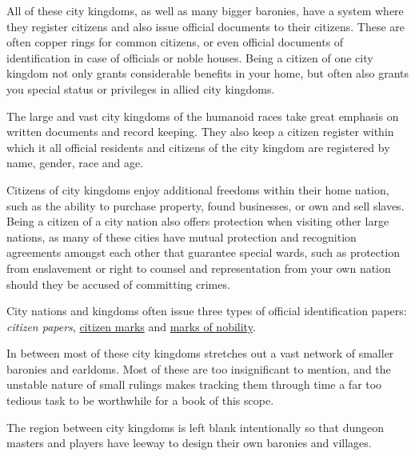 All of these city kingdoms, as well as many bigger baronies, have a system
where they register citizens and also issue official documents to their
citizens. These are often copper rings for common citizens, or even official
documents of identification in case of officials or noble houses. Being a
citizen of one city kingdom not only grants considerable benefits in your
home, but often also grants you special status or privileges in allied city
kingdoms.

The large and vast city kingdoms of the humanoid races take great emphasis
on written documents and record keeping. They also keep a citizen register
within which it all official residents and citizens of the city kingdom are
registered by name, gender, race and age.

Citizens of city kingdoms enjoy additional freedoms within their home nation,
such as the ability to purchase property, found businesses, or own and sell
slaves. Being a citizen of a city nation also offers protection when visiting
other large nations, as many of these cities have mutual protection and
recognition agreements amongst each other that guarantee special wards, such
as protection from enslavement or right to counsel and representation from your
own nation should they be accused of committing crimes.

City nations and kingdoms often issue three types of official identification
papers: \emph{citizen papers}, \hyperref[sec:Citizen Mark]{citizen marks} and
\hyperref[sec:Nobility Mark]{marks of nobility}.

In between most of these city kingdoms stretches out a vast network of smaller
baronies and earldoms. Most of these are too insignificant to mention, and the
unstable nature of small rulings makes tracking them through time a far too
tedious task to be worthwhile for a book of this scope.


\begin{note}
  The region between city kingdoms is left blank intentionally so that dungeon
  masters and players have leeway to design their own baronies and villages.
\end{note}















